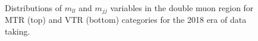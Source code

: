 \begin{figure}[htbp]
{    }
  \caption{Distributions of $m_{ll}$ and $m_{jj}$ variables in the double muon region for MTR (top) and VTR (bottom) categories for the 2018 era of data taking.}
  \label{fig:2018_Zmumu_1}
\end{figure}


